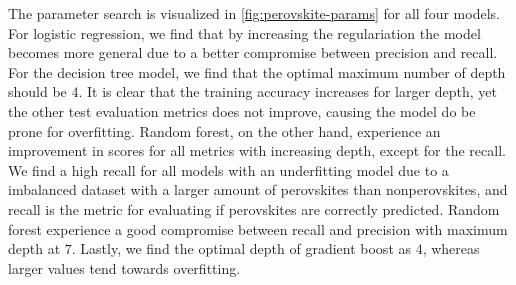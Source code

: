 \begin{table}[!ht]
\centering
\caption{Table with corresponding best estimators during a grid search scheme for predicting perovskites or not. The test score is here referred to as a balanced accuracy score, and we list all standard deviations in paranthesis.}
\label{tab:perovskite-optimal}
\noindent{}
\end{table}

The parameter search is visualized in \autoref{fig:perovskite-params} for all four models. For logistic regression, we find that by increasing the regulariation the model becomes more general due to a better compromise between precision and recall. For the decision tree model, we find that the optimal maximum number of depth should be $4$. It is clear that the training accuracy increases for larger depth, yet the other test evaluation metrics does not improve, causing the model do be prone for overfitting. Random forest, on the other hand, experience an improvement in scores for all metrics with increasing depth, except for the recall. We find a high recall for all models with an underfitting model due to a imbalanced dataset with a larger amount of perovskites than nonperovskites, and recall is the metric for evaluating if perovskites are correctly predicted. Random forest experience a good compromise between recall and precision with maximum depth at $7$. Lastly, we find the optimal depth of gradient boost as $4$, whereas larger values tend towards overfitting.

